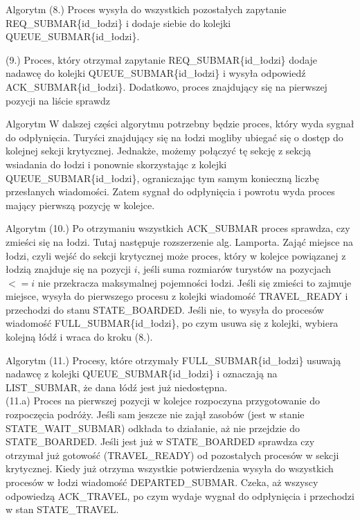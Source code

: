 \documentclass{beamer}
\begin{document}
\begin{frame}{Algorytm}
    \internallinenumbers
    (8.) Proces wysyła do wszystkich pozostałych zapytanie REQ\_SUBMAR\{id\_łodzi\} i dodaje siebie do kolejki QUEUE\_SUBMAR\{id\_łodzi\}.

    \vspace{0.5cm}
    (9.) Proces, który otrzymał zapytanie REQ\_SUBMAR\{id\_łodzi\} dodaje nadawcę do kolejki QUEUE\_SUBMAR\{id\_łodzi\} i wysyła odpowiedź ACK\_SUBMAR\{id\_łodzi\}.
    Dodatkowo, proces znajdujący się na pierwszej pozycji na liście sprawdz

\end{frame}

\begin{frame}{Algorytm}
    \internallinenumbers
    W dalszej części algorytmu potrzebny będzie proces, który wyda sygnał do odpłynięcia. Turyści znajdujący się na łodzi mogliby ubiegać się o dostęp do kolejnej sekcji krytycznej. Jednakże, możemy połączyć tę sekcję z sekcją wsiadania do łodzi i ponownie skorzystając z kolejki QUEUE\_SUBMAR\{id\_łodzi\}, ograniczając tym samym konieczną liczbę przesłanych wiadomości. Zatem sygnał do odpłynięcia i powrotu wyda proces mający pierwszą pozycję w kolejce.
\end{frame}

\begin{frame}{Algorytm}
    \internallinenumbers
    (10.) Po otrzymaniu wszystkich ACK\_SUBMAR proces sprawdza, czy zmieści się na łodzi. Tutaj następuje rozszerzenie alg. Lamporta. Zająć miejsce na łodzi, czyli wejść do sekcji krytycznej może proces, który w kolejce powiązanej z łodzią znajduje się na pozycji $i$, jeśli suma rozmiarów turystów na pozycjach $<= i$ nie przekracza maksymalnej pojemności łodzi. Jeśli się zmieści to zajmuje miejsce, wysyła do pierwszego procesu z kolejki wiadomość TRAVEL\_READY i przechodzi do stanu STATE\_BOARDED. Jeśli nie, to wysyła do procesów wiadomość FULL\_SUBMAR\{id\_łodzi\}, po czym usuwa się z kolejki, wybiera kolejną łódź i wraca do kroku (8.).
\end{frame}

\begin{frame}{Algorytm}
    \internallinenumbers
    (11.) Procesy, które otrzymały FULL\_SUBMAR\{id\_łodzi\} usuwają nadawcę z kolejki QUEUE\_SUBMAR\{id\_łodzi\} i oznaczają na LIST\_SUBMAR, że dana łódź jest już niedostępna. \\

    (11.a) Proces na pierwszej pozycji w kolejce rozpoczyna przygotowanie do rozpoczęcia podróży. Jeśli sam jeszcze nie zajął zasobów (jest w stanie STATE\_WAIT\_SUBMAR) odkłada to działanie, aż nie przejdzie do STATE\_BOARDED. Jeśli jest już w STATE\_BOARDED sprawdza czy otrzymał już gotowość (TRAVEL\_READY) od pozostałych procesów w sekcji krytycznej. Kiedy już otrzyma wszystkie potwierdzenia wysyła do wszystkich procesów w łodzi wiadomość DEPARTED\_SUBMAR. Czeka, aż wszyscy odpowiedzą ACK\_TRAVEL, po czym wydaje wygnał do odpłynięcia i przechodzi w stan STATE\_TRAVEL.
\end{frame}
\end{document}
